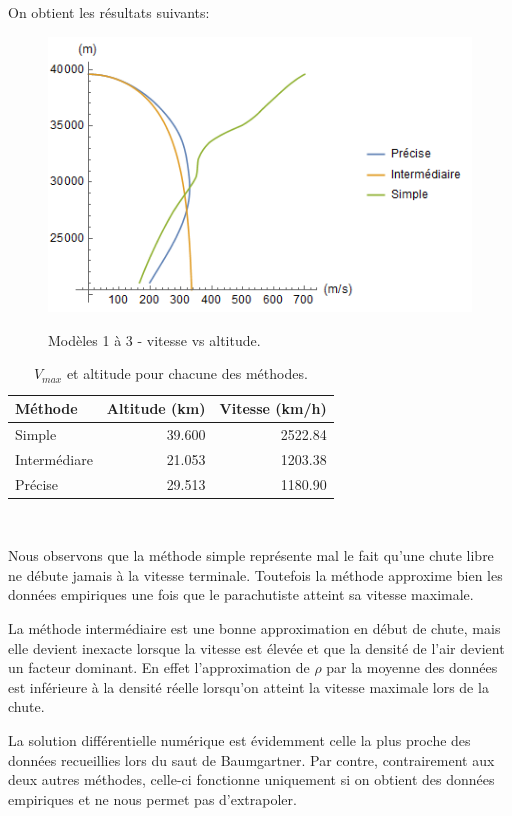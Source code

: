 \documentclass[12pt]{article}
\begin{document}
\noindent
On obtient les r\'esultats suivants:
\begin{figure}[h]
    \centering
    \includegraphics{AltitudeVsVitesse.png}\\
    \caption{Mod\`eles 1 \`a 3 - vitesse vs altitude.}
\end{figure}

\clearpage

\begin{table}[h]
    \centering
    \begin{tabular}{|l|r|r|}\hline
        M\'ethode &Altitude (km) &Vitesse (km/h)\\\hline
        Simple &39.600 &2522.84\\\hline
        Interm\'ediare &21.053 &1203.38\\\hline
        Pr\'ecise &29.513 &1180.90\\\hline
    \end{tabular}\\
    \caption{$V_{max}$ et altitude pour chacune des m\'ethodes.}
\end{table}

Nous observons que la m\'ethode simple repr\'esente mal le fait qu'une chute libre ne d\'ebute jamais \`a la vitesse terminale.
Toutefois la m\'ethode approxime bien les donn\'ees empiriques une fois que le parachutiste atteint sa vitesse maximale.

La m\'ethode interm\'ediaire est une bonne approximation en d\'ebut de chute, mais elle devient inexacte lorsque la vitesse est \'elev\'ee et que la densit\'e de l'air devient un facteur dominant.
En effet l'approximation de $\rho$ par la moyenne des donn\'ees est inf\'erieure \`a la densit\'e r\'eelle lorsqu'on atteint la vitesse maximale lors de la chute.

La solution diff\'erentielle num\'erique est \'evidemment celle la plus proche des donn\'ees recueillies lors du saut de Baumgartner.
Par contre, contrairement aux deux autres m\'ethodes, celle-ci fonctionne uniquement si on obtient des donn\'ees empiriques et ne nous permet pas d'extrapoler.
\end{document}
